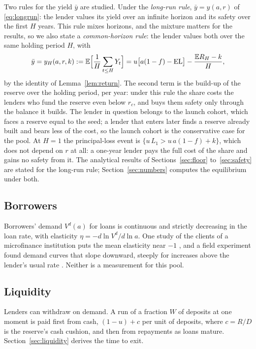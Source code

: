 \documentclass[preprint,11pt,authoryear]{elsarticle}
\theoremstyle{definition}
\newcommand{\E}{\mathbb{E}}
\newcommand{\EL}{\mathrm{EL}}
\begin{document}
Two rules for the yield $\bar y$ are studied. Under the \emph{long-run rule}, $\bar y=y(a,r)$ of
\eqref{eq:longrun}: the lender values its yield over an infinite horizon and its safety over the first
$H$ years. This rule mixes horizons, and the mixture matters for the results, so we also state a
\emph{common-horizon rule}: the lender values both over the same holding period $H$, with
\begin{equation}\label{eq:yH}
  \bar y=y_H(a,r,k):=\E\Bigl[\frac1H\sum_{t\le H}Y_t\Bigr]=u\bigl[a(1-f)-\EL\bigr]-\frac{\E R_H-k}{H},
\end{equation}
by the identity of Lemma~\ref{lem:return}. The second term is the build-up of the reserve over the
holding period, per year: under this rule the share costs the lenders who fund the reserve even
below $r_c$, and buys them safety only through the balance it builds. The lender in question belongs
to the launch cohort, which faces a reserve equal to the seed; a lender that enters later finds a
reserve already built and bears less of the cost, so the launch cohort is the conservative case for
the pool. At $H=1$ the principal-loss event is $\{u\,L_1>u\,a(1-f)+k\}$, which does not depend on
$r$ at all: a one-year lender pays the full cost of the share and gains no safety from it. The
analytical results of Sections~\ref{sec:floor} to~\ref{sec:safety} are stated for the long-run rule;
Section~\ref{sec:numbers} computes the equilibrium under both.

\subsection{Borrowers}

Borrowers' demand $V^d(a)$ for loans is continuous and strictly decreasing in the loan rate, with
elasticity $\eta=-d\ln V^d/d\ln a$. One study of the clients of a microfinance institution puts the mean
elasticity near $-1$ \citep{bogan2015}, and a field experiment found demand curves that slope downward, steeply for
increases above the lender's usual rate \citep{karlan2008}. Neither is a measurement for this pool.

\subsection{Liquidity}

Lenders can withdraw on demand. A run of a fraction $W$ of deposits at one moment is paid first
from cash, $(1-u)+c$ per unit of deposits, where $c=R/D$ is the reserve's cash cushion, and then
from repayments as loans mature. Section~\ref{sec:liquidity} derives the time to exit.
\end{document}
